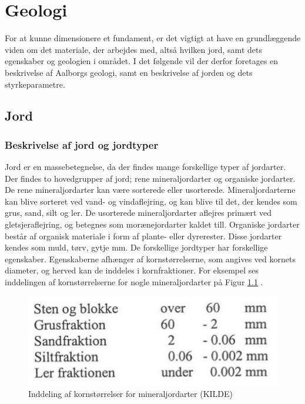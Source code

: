 \chapter{Geologi}
For at kunne dimensionere et fundament, er det vigtigt at have en grundlæggende viden om det materiale, der arbejdes med, altså hvilken jord, samt dets egenskaber og geologien i området. I det følgende vil der derfor foretages en beskrivelse af Aalborgs geologi, samt en beskrivelse af jorden og dets styrkeparametre.

\section{Jord}
\subsection{Beskrivelse af jord og jordtyper}
Jord er en massebetegnelse, da der findes mange forskellige typer af jordarter. Der findes to hovedgrupper af jord; rene mineraljordarter og organiske jordarter. 
\newline \indent{     }  De rene mineraljordarter kan være sorterede eller usorterede. Mineraljordarterne kan blive sorteret ved vand- og vindaflejring, og kan blive til det, der kendes som grus, sand, silt og ler. De usorterede mineraljordarter aflejres primært ved gletsjeraflejring, og betegnes som morænejordarter kaldet till.\citep{jordarter}
\newline \indent{     }  Organiske jordarter består af organisk materiale i form af plante- eller dyrerester. Disse jordarter kendes som muld, tørv, gytje mm.\citep{miljo}
\newline \indent{     }  De forskellige jordtyper har forskellige egenskaber. Egenskaberne afhænger af kornstørrelserne, som angives ved kornets diameter, og herved kan de inddeles i kornfraktioner\citep{geoteknik}. For eksempel ses inddelingen af kornstørrelserne for nogle mineraljordarter på Figur \ref{fig:kornstorrelser} .

\begin{figure}[htbp] \centering
	\begin{minipage}[b]{0.48\textwidth}\centering
		\includegraphics[width=1.0\textwidth]{billeder/kornetsdiameter.png}
		\caption{Inddeling af kornstørrelser for mineraljordarter (KILDE)}
		\label{fig:kornstorrelser}
	\end{minipage}\hfill
\end{figure}

